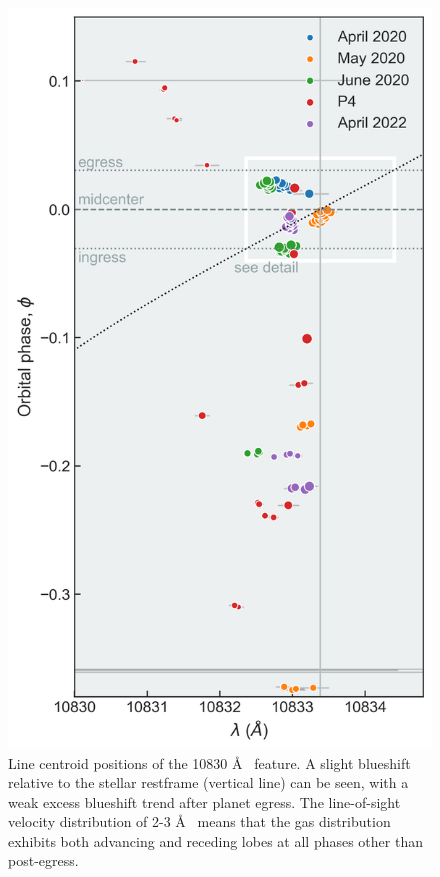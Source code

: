 \documentclass[twocolumn]{aastex631}
\begin{document}
\begin{figure}
    \centering
    \includegraphics[width=\linewidth]{figures/centroid_overview10833.png}
    \caption{Line centroid positions of the   10830 \AA~ feature.  A slight blueshift relative to the stellar restframe (vertical line) can be seen, with a weak excess blueshift trend after planet egress. The line-of-sight velocity distribution of 2-3 \AA~ means that the gas distribution exhibits both advancing and receding lobes at all phases other than post-egress.}
    \label{fig:centroids}
\end{figure}
\end{document}
